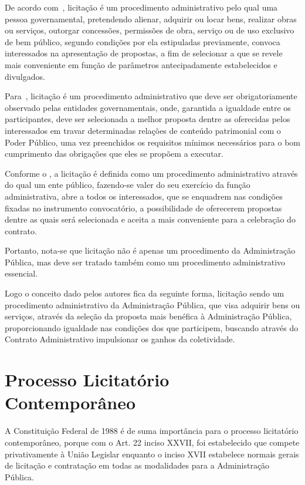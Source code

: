 De acordo com~\cite[p.519]{mello2009celso}, licitação é um procedimento administrativo pelo qual uma pessoa governamental, pretendendo alienar, adquirir ou locar bens, realizar obras ou serviços, outorgar concessões, permissões de obra, serviço ou de uso exclusivo de bem público, segundo condições por ela estipuladas previamente, convoca interessados na apresentação de propostas, a fim de selecionar a que se revele mais conveniente em função de parâmetros antecipadamente estabelecidos e divulgados.

Para~\cite[p.576]{alexandrino2008direito}, licitação é um procedimento administrativo que deve ser obrigatoriamente observado pelas entidades governamentais, onde, garantida a igualdade entre os participantes, deve ser selecionada a melhor proposta dentre as oferecidas pelos interessados em travar determinadas relações de conteúdo patrimonial com o Poder Público, uma vez preenchidos os requisitos mínimos necessários para o bom cumprimento das obrigações que eles se propõem a executar.

Conforme o \cite[p.356]{di2006500}, a licitação é definida como um procedimento administrativo através do qual um ente público, fazendo-se valer do seu exercício da função administrativa, abre a todos os interessados, que se enquadrem nas condições fixadas no instrumento convocatório, a possibilidade de oferecerem propostas dentre as quais será selecionada e aceita a mais conveniente para a celebração do contrato.

Portanto, nota-se que licitação não é apenas um procedimento da Administração Pública, mas deve ser tratado também como um procedimento administrativo essencial.

Logo o conceito dado pelos autores fica da seguinte forma, licitação sendo um procedimento administrativo da Administração Pública, que visa adquirir bens ou serviços, através da seleção da proposta mais benéfica à Administração Pública, proporcionando igualdade nas condições dos que participem, buscando através do Contrato Administrativo impulsionar os ganhos da coletividade.

\section{Processo Licitatório Contemporâneo}

A Constituição Federal de 1988 é de suma importância para o processo licitatório contemporâneo, porque com o Art. 22 inciso XXVII, foi estabelecido que compete privativamente à União Legislar enquanto o inciso XVII estabelece normais gerais de licitação e contratação em todas as modalidades para a Administração Pública.

